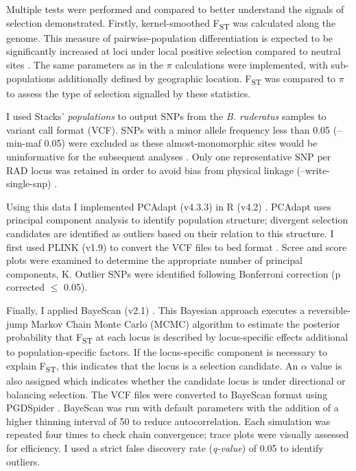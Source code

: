 \documentclass[12pt]{article}
\begin{document}
\begin{linenumbers}
		Multiple tests were performed and compared to better understand the signals of selection demonstrated. Firstly, kernel-smoothed F\textsubscript{ST} was calculated along the genome. This measure of pairwise-population differentiation is expected to be significantly increased at loci under local positive selection compared to neutral sites \citep{weigand_detecting_2018}. The same parameters as in the $\pi$ calculations were implemented, with sub-populations additionally defined by geographic location. 
		F\textsubscript{ST} was compared to $\pi$ to assess the type of selection signalled by these statistics.
		
		I used Stacks' \emph{populations} to output SNPs from the \emph{B. ruderatus} samples to variant call format (VCF). SNPs with a minor allele frequency less than 0.05 (--min-maf 0.05) were excluded as these almost-monomorphic sites would be uninformative for the subsequent analyses \citep{foll_genome-scan_2008, whitlock_reliable_2015}. Only one representative SNP per RAD locus was retained in order to avoid bias from physical linkage (--write-single-snp) \citep{drinan_population_2018, leiva_population_2019}.
		
		Using this data I implemented PCAdapt (v4.3.3) in R (v4.2)  \citep{duforet-frebourg_detecting_2016, luu_pcadapt_2017, prive_performing_2020, r_core_team_r_2022}. PCAdapt uses principal component analysis to identify population structure; divergent selection candidates are identified as outliers based on their relation to this structure. I first used PLINK (v1.9) to convert the VCF files to bed format \citep{chang_second-generation_2015, purcell_plink_2007, purcell_plink_2022}. Scree and score plots were examined to determine the appropriate number of principal components, K. Outlier SNPs were identified following Bonferroni correction (p corrected $\leq$ 0.05).
		
		Finally, I applied BayeScan (v2.1) \citep{foll_genome-scan_2008}. This Bayesian approach executes a reversible-jump Markov Chain Monte Carlo (MCMC) algorithm to estimate the posterior probability that F\textsubscript{ST} at each locus is described by locus-specific effects additional to population-specific factors. If the locus-specific component is necessary to explain F\textsubscript{ST}, this indicates that the locus is a selection candidate. An $\alpha$ value is also assigned which indicates whether the candidate locus is under directional or balancing selection. 
		The VCF files were converted to BayeScan format using PGDSpider \citep{lischer_pgdspider_2012}. BayeScan was run with default parameters with the addition of a higher thinning interval of 50 to reduce autocorrelation. 
		Each simulation was repeated four times to check chain convergence; trace plots were visually assessed for efficiency. I used a strict false discovery rate (\emph{q-value}) of 0.05 to identify outliers. 
		

\end{linenumbers}
\end{document}

